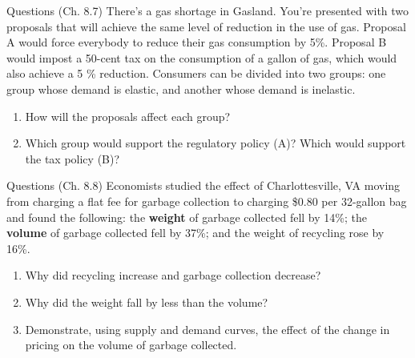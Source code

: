\documentclass{beamer}
\begin{document}
\begin{frame}{Questions}
(Ch. 8.7) There's a gas shortage in Gasland. You're presented with two proposals that will achieve the same level of reduction in the use  of gas. Proposal A would force everybody to reduce their gas consumption by 5\%. Proposal B would impost a 50-cent tax on the consumption of a gallon of gas, which would also achieve a 5 \% reduction. Consumers can be divided into two groups: one group whose demand is elastic, and another whose demand is inelastic.
\begin{enumerate}[label=\alph*)]
\item How will the proposals affect each group?
\item Which group would support the regulatory policy (A)? Which would support the tax policy (B)?
\end{enumerate}
\end{frame}

\begin{frame}{Questions}
(Ch. 8.8) Economists studied the effect of Charlottesville, VA moving from charging a flat fee for garbage collection to charging \$0.80 per 32-gallon bag and found the following: the \textbf{weight} of garbage collected fell by 14\%; the \textbf{volume} of garbage collected fell by 37\%; and the weight of recycling rose by 16\%.
\begin{enumerate}[label=\alph*)]
\item Why did recycling increase and garbage collection decrease?
\item Why did the weight fall by less than the volume?
\item Demonstrate, using supply and demand curves, the effect of the change in pricing on the volume of garbage collected.
\end{enumerate}
\end{frame}
\end{document}
